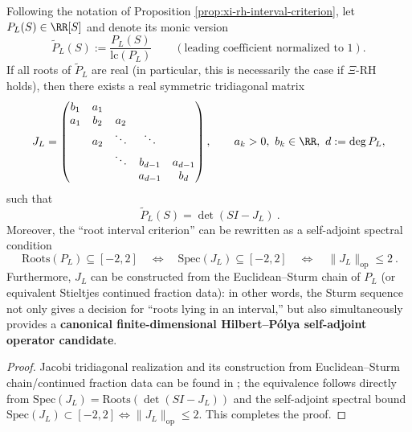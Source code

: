 \begin{proposition}\label{prop:xi-hilbert-polya-jacobi}
Following the notation of Proposition \ref{prop:xi-rh-interval-criterion}, let \(P_L(S)\in\RR[S]\) and denote its monic version
\[
\widetilde P_L(S):=\frac{P_L(S)}{\mathrm{lc}(P_L)}\qquad(\text{leading coefficient normalized to }1).
\]
If all roots of \(\widetilde P_L\) are real (in particular, this is necessarily the case if \(\Xi\)-RH holds), then there exists a real symmetric tridiagonal matrix
\[
J_L=\begin{pmatrix}
b_1 & a_1 \\
a_1 & b_2 & a_2\\
& a_2 & \ddots & \ddots\\
& & \ddots & b_{d-1} & a_{d-1}\\
& & & a_{d-1} & b_d
\end{pmatrix},\qquad a_k>0,\ b_k\in\RR,\ d:=\deg P_L,
\]
such that
\[
\boxed{\ \widetilde P_L(S)=\det(SI-J_L)\ }.
\]
Moreover, the ``root interval criterion'' can be rewritten as a self-adjoint spectral condition
\[
\boxed{\ \mathrm{Roots}(P_L)\subseteq[-2,2]\quad\Longleftrightarrow\quad \mathrm{Spec}(J_L)\subseteq[-2,2]\quad\Longleftrightarrow\quad \|J_L\|_{\mathrm{op}}\le 2\ }.
\]
Furthermore, \(J_L\) can be constructed from the Euclidean--Sturm chain of \(P_L\) (or equivalent Stieltjes continued fraction data): in other words, the Sturm sequence not only gives a decision for ``roots lying in an interval,'' but also simultaneously provides a \textbf{canonical finite-dimensional Hilbert--P{\'o}lya self-adjoint operator candidate}.
\end{proposition}
\begin{proof}
Jacobi tridiagonal realization and its construction from Euclidean--Sturm chain/continued fraction data can be found in \cite{Fiedler1990SymmetricCharpoly,Schmeisser1993TridiagonalGivenCharpoly}; the equivalence follows directly from \(\mathrm{Spec}(J_L)=\mathrm{Roots}(\det(SI-J_L))\) and the self-adjoint spectral bound \(\mathrm{Spec}(J_L)\subset[-2,2]\iff \|J_L\|_{\mathrm{op}}\le 2\). This completes the proof.
\end{proof}

